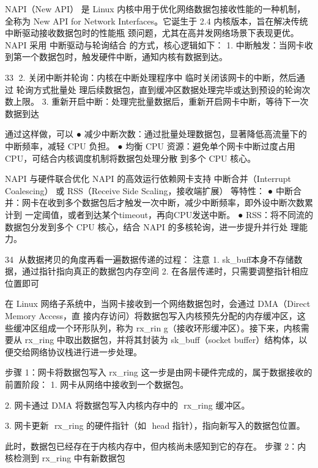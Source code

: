 NAPI（New API） 是 Linux 内核中用于优化网络数据包接收性能的一种机制，全称为 New API
for Network Interfaces。它诞生于 2.4 内核版本，旨在解决传统中断驱动接收数据包时的性能瓶
颈问题，尤其在高并发网络场景下表现更优。
NAPI 采用 中断驱动与轮询结合 的方式，核心逻辑如下：
 1. 中断触发：当网卡收到第一个数据包时，触发硬件中断，通知内核有数据到达。



                                                          33
2.  关闭中断并轮询：内核在中断处理程序中 临时关闭该网卡的中断，然后通过 轮询方式批量处
    理后续数据包，直到缓冲区数据处理完毕或达到预设的轮询次数上限。
 3. 重新开启中断：处理完批量数据后，重新开启网卡中断，等待下一次数据到达

通过这样做，可以
 ● 减少中断次数：通过批量处理数据包，显著降低高流量下的中断频率，减轻 CPU 负担。
 ● 均衡 CPU 资源：避免单个网卡中断过度占用 CPU，可结合内核调度机制将数据包处理分散
    到多个 CPU 核心。




NAPI 与硬件联合优化
NAPI 的高效运行依赖网卡支持 中断合并（Interrupt Coalescing） 或 RSS（Receive Side
Scaling，接收端扩展） 等特性：
 ● 中断合并：网卡在收到多个数据包后才触发一次中断，减少中断频率，即外设中断次数累计到
   一定阈值，或者到达某个timeout，再向CPU发送中断。
 ● RSS：将不同流的数据包分发到多个 CPU 核心，结合 NAPI 的多核轮询，进一步提升并行处
   理能力。

                                                            34
从数据拷贝的角度再看一遍数据传递的过程：
注意
 1. sk_buff本身不存储数据，通过指针指向真正的数据包内存空间
 2. 在各层传递时，只需要调整指针相应位置即可




在 Linux 网络子系统中，当网卡接收到一个网络数据包时，会通过 DMA（Direct Memory Access，直
接内存访问）将数据包写入内核预先分配的内存缓冲区，这些缓冲区组成一个环形队列，称为 ﻿rx_rin
g﻿（接收环形缓冲区）。接下来，内核需要从 rx_ring﻿ 中取出数据包，并将其封装为
 sk_buff﻿（socket buffer）结构体，以便交给网络协议栈进行进一步处理。

步骤 1：网卡将数据包写入 ﻿rx_ring﻿
这一步是由网卡硬件完成的，属于数据接收的前置阶段：
 1. 网卡从网络中接收到一个数据包。

 2. 网卡通过 DMA 将数据包写入内核内存中的 ﻿      rx_ring﻿ 缓冲区。

 3. 网卡更新 ﻿ rx_ring﻿ 的硬件指针（如 ﻿ head﻿ 指针），指向新写入的数据包位置。

此时，数据包已经存在于内核内存中，但内核尚未感知到它的存在。
步骤 2：内核检测到 ﻿rx_ring﻿ 中有新数据包


